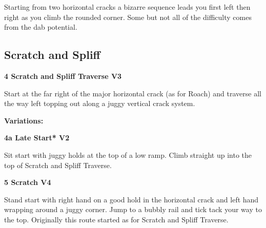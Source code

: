 \begin{multicols}{2}
			\begin{adjustwidth}{0.5cm}{}			
			Starting from two horizontal cracks a bizarre sequence leads you first left then right as you climb the rounded corner. Some but not all of the difficulty comes from the dab potential.
			\end{adjustwidth}
			
			
		


		\needspace{1.5cm}
		\subsection*{Scratch and Spliff}\label{bf:Scratch and Spliff}
			
		
			
			\needspace{1.5cm}
\label{rt:Scratch and Spliff Traverse}
\colorbox{green!20}{
\parbox{0.95\linewidth}{
\textbf{
4 Scratch and Spliff Traverse V3  
}}}

			\begin{adjustwidth}{0.5cm}{}			
			Start at the far right of the major horizontal crack (as for Roach) and traverse all the way left topping out along a juggy vertical crack system.
			\end{adjustwidth}
			
				\begin{adjustwidth}{0.5cm}{}				
				\needspace{3cm}
				\textbf{Variations:} \newline
					
					\needspace{1.5cm}
\label{vr:Late Start}
\colorbox{green!20}{
\parbox{0.95\linewidth}{
\textbf{
4a Late Start* V2  
}}}

					\begin{adjustwidth}{0.5cm}{}			
					Sit start with juggy holds at the top of a low ramp. Climb straight up into the top of Scratch and Spliff Traverse.
					\end{adjustwidth}
					
					
				\end{adjustwidth}
			
			
			\needspace{1.5cm}
\label{rt:Scratch}
\colorbox{RoyalBlue!20}{
\parbox{0.95\linewidth}{
\textbf{
5 Scratch V4  
}}}

			\begin{adjustwidth}{0.5cm}{}			
			Stand start with right hand on a good hold in the horizontal crack and left hand wrapping around a juggy corner. Jump to a bubbly rail and tick tack your way to the top. Originally this route started as for Scratch and Spliff Traverse.
			\end{adjustwidth}
			

\end{multicols}

